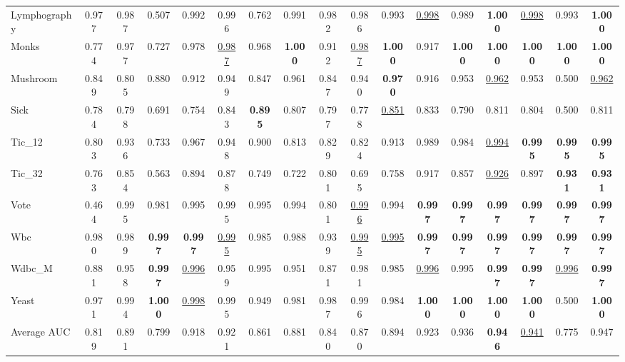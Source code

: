 \documentclass[ASNA,twocolumn]{USG} %
\begin{document}
\begin{table}[!ht]
{\begin{tabular}{lccccccccccc|cccc|c}
            Lymphography & 0.977 & 0.987 & 0.507 & 0.992 & 0.996 & 0.762 & 0.991 & 0.982 & 0.986 & 0.993 & \underline{0.998} & 0.989 & \textbf{1.000} & \underline{0.998} & 0.993 & \textbf{1.000} \\
            Monks & 0.774 & 0.977 & 0.727 & 0.978 & \underline{0.987} & 0.968 & \textbf{1.000} & 0.912 & \underline{0.987} & \textbf{1.000} & 0.917 & \textbf{1.000} & \textbf{1.000} & \textbf{1.000} & \textbf{1.000} & \textbf{1.000} \\
            Mushroom & 0.849 & 0.805 & 0.880 & 0.912 & 0.949 & 0.847 & 0.961 & 0.847 & 0.940 & \textbf{0.970} & 0.916 & 0.953 & \underline{0.962} & 0.953 & 0.500 & \underline{0.962} \\
            Sick & 0.784 & 0.798 & 0.691 & 0.754 & 0.843 & \textbf{0.895} & 0.807 & 0.797 & 0.778 & \underline{0.851} & 0.833 & 0.790 & 0.811 & 0.804 & 0.500 & 0.811 \\
            Tic\_12 & 0.803 & 0.936 & 0.733 & 0.967 & 0.948 & 0.900 & 0.813 & 0.829 & 0.824 & 0.913 & 0.989 & 0.984 & \underline{0.994} & \textbf{0.995} & \textbf{0.995} & \textbf{0.995} \\
            Tic\_32 & 0.763 & 0.854 & 0.563 & 0.894 & 0.878 & 0.749 & 0.722 & 0.801 & 0.695 & 0.758 & 0.917 & 0.857 & \underline{0.926} & 0.897 & \textbf{0.931} & \textbf{0.931} \\
            Vote & 0.464 & 0.995 & 0.981 & 0.995 & 0.995 & 0.995 & 0.994 & 0.801 & \underline{0.996} & 0.994 & \textbf{0.997} & \textbf{0.997} & \textbf{0.997} & \textbf{0.997} & \textbf{0.997} & \textbf{0.997} \\
            Wbc & 0.980 & 0.989 & \textbf{0.997} & \textbf{0.997} & \underline{0.995} & 0.985 & 0.988 & 0.939 & \underline{0.995} & \underline{0.995} & \textbf{0.997} & \textbf{0.997} & \textbf{0.997} & \textbf{0.997} & \textbf{0.997} & \textbf{0.997} \\
            Wdbc\_M & 0.881 & 0.958 & \textbf{0.997} & \underline{0.996} & 0.959 & 0.995 & 0.951 & 0.871 & 0.981 & 0.985 & \underline{0.996} & 0.995 & \textbf{0.997} & \textbf{0.997} & \underline{0.996} & \textbf{0.997} \\
            Yeast & 0.971 & 0.994 & \textbf{1.000} & \underline{0.998} & 0.995 & 0.949 & 0.981 & 0.987 & 0.996 & 0.984 & \textbf{1.000} & \textbf{1.000} & \textbf{1.000} & \textbf{1.000} & 0.500 & \textbf{1.000} \\
            \midrule
            Average AUC & 0.819 & 0.891 & 0.799 & 0.918 & 0.921 & 0.861 & 0.881 & 0.840 & 0.870 & 0.894 & 0.923 & 0.936 & \textbf{0.946} & \underline{0.941} & 0.775 & 0.947 \\

\end{tabular}}
\end{table}
\end{document}
